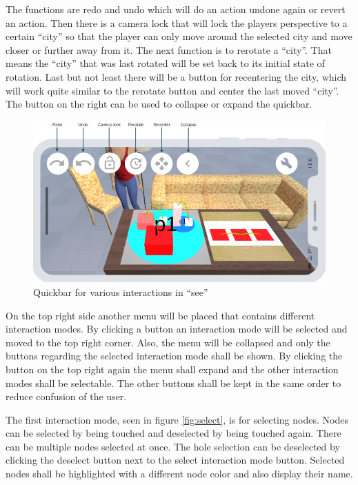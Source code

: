 The functions are redo and undo which will do an action undone again or revert an action.
Then there is a camera lock that will lock the players perspective to a certain \enquote{\gls{city}} so that the player can only move around the selected city and move closer or further away from it.
The next function is to rerotate a \enquote{\gls{city}}.
That means the \enquote{\gls{city}} that was last rotated will be set back to its initial state of rotation.
Last but not least there will be a button for recentering the city, which will work quite similar to the rerotate button and center the last moved \enquote{\gls{city}}.
The button on the right can be used to collapse or expand the quickbar.
\begin{figure}[htb]
    \centering
    \includegraphics[width=1\textwidth]{Concept/img/quickbar.png}
    \caption{Quickbar for various interactions in \enquote{\gls{see}}}\label{fig:quickbar}
\end{figure}

On the top right side another menu will be placed that contains different interaction modes.
By clicking a button an interaction mode will be selected and moved to the top right corner.
Also, the menu will be collapsed and only the buttons regarding the selected interaction mode shall be shown.
By clicking the button on the top right again the menu shall expand and the other interaction modes shall be selectable.
The other buttons shall be kept in the same order to reduce confusion of the user.

The first interaction mode, seen in figure \ref{fig:select}, is for selecting nodes.
Nodes can be selected by being touched and deselected by being touched again.
There can be multiple nodes selected at once.
The hole selection can be deselected by clicking the deselect button next to the select interaction mode button.
Selected nodes shall be highlighted with a different node color and also display their name.

